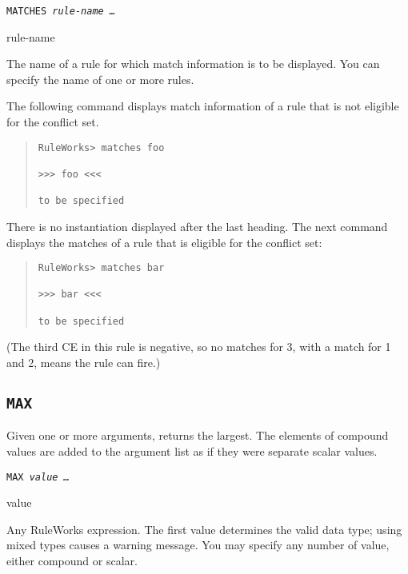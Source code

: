 \tt{MATCHES} \it{rule-name} \ldots

\begin{arguments}
\item[rule-name]

  The name of a rule for which match information is to be
  displayed. You can specify the name of one or more rules.
\end{arguments}

\Example

The following command displays match information of a rule that is not
eligible for the conflict set.

\begin{quote}
\begin{verbatim}
RuleWorks> matches foo

>>> foo <<<

to be specified
\end{verbatim}
\end{quote}

\begin{note}
  There is no instantiation displayed after the last heading. The next
  command displays the matches of a rule that is eligible for the
  conflict set:
\end{note}

\begin{quote}
\begin{verbatim}
RuleWorks> matches bar

>>> bar <<<

to be specified
\end{verbatim}
\end{quote}

(The third CE in this rule is negative, so no matches for 3, with a
match for 1 and 2, means the rule can fire.)

\subsection{\tt{MAX}}

Given one or more arguments, returns the largest. The
elements of compound values are added to the argument list as
if they were separate scalar values.

\Format

\tt{MAX} \it{value} \ldots

\begin{arguments}

\item[value]

  Any RuleWorks expression. The first value determines the valid data
  type; using mixed types causes a warning message.  You may specify
  any number of value, either compound or scalar.
\end{arguments}

